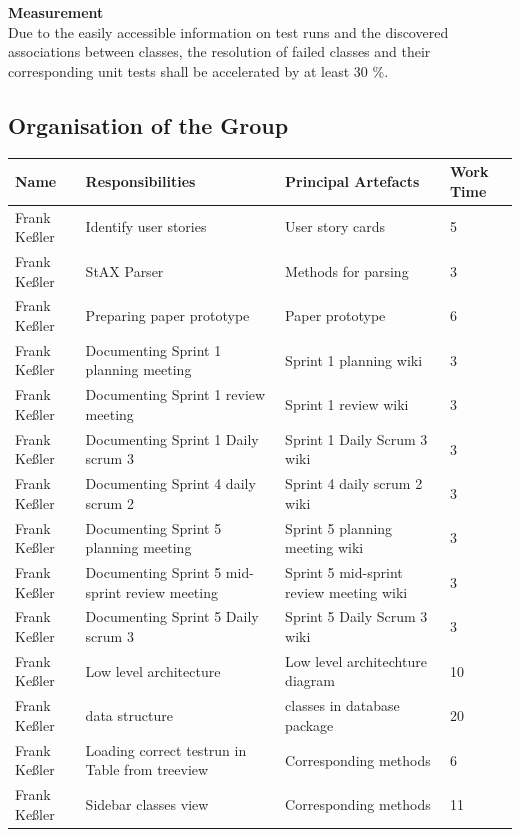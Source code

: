 {\large\textbf{Measurement}}\\ 
Due to the easily accessible information on test runs and the discovered associations between classes, the resolution of failed classes and their corresponding unit tests shall be accelerated by at least 30 \%. 

\subsection{Organisation of the Group}
\begin{longtable}{|p{}||p{}|p{}|p{}|}
  \hline
  
  
    Name & Responsibilities & Principal Artefacts & Work Time\\
    \hline
    \hline
    Frank Keßler & Identify user stories & User story cards & 5 \\
    \hline
    Frank Keßler & StAX Parser & Methods for parsing & 3 \\ 
    \hline
    Frank Keßler & Preparing paper prototype & Paper prototype & 6 \\ 
    \hline
    Frank Keßler & Documenting Sprint 1 planning meeting & Sprint 1 planning wiki & 3 \\
    \hline
    Frank Keßler & Documenting Sprint 1 review meeting & Sprint 1 review wiki & 3 \\
	\hline
	Frank Keßler & Documenting Sprint 1 Daily scrum 3 & Sprint 1 Daily Scrum 3 wiki & 3 \\
	\hline
    Frank Keßler & Documenting Sprint 4 daily scrum 2 & Sprint 4 daily scrum 2 wiki & 3 \\
	\hline
	Frank Keßler & Documenting Sprint 5 planning meeting & Sprint 5 planning meeting wiki & 3 \\
	\hline
	Frank Keßler & Documenting Sprint 5 mid-sprint review meeting & Sprint 5 mid-sprint review meeting wiki & 3 \\
	\hline
	Frank Keßler & Documenting Sprint 5 Daily scrum 3 & Sprint 5 Daily Scrum 3 wiki & 3 \\
	\hline
    Frank Keßler & Low level architecture & Low level architechture diagram & 10 \\ 
    \hline
    Frank Keßler & data structure & classes in database package & 20 \\ 
    \hline 
    Frank Keßler & Loading correct testrun in Table from treeview & Corresponding methods & 6 \\ 
    \hline
    Frank Keßler & Sidebar classes view & Corresponding methods & 11 \\ 

\end{longtable}
